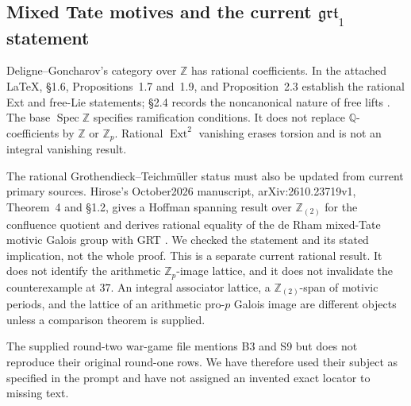 \documentclass[11pt,a4paper]{article}
\theoremstyle{definition}
\begin{document}
\subsection{Mixed Tate motives and the current \texorpdfstring{$\mathfrak{grt}_1$}{grt1} statement}

Deligne--Goncharov's category over $\mathbb Z$ has rational coefficients. In the attached LaTeX, \S1.6, Propositions~1.7 and~1.9, and Proposition~2.3 establish the rational Ext and free-Lie statements; \S2.4 records the noncanonical nature of free lifts \cite{DeligneGoncharov2005}. The base $\operatorname{Spec}\mathbb Z$ specifies ramification conditions. It does not replace $\mathbb Q$-coefficients by $\mathbb Z$ or $\mathbb Z_p$. Rational $\operatorname{Ext}^2$ vanishing erases torsion and is not an integral vanishing result.

The rational Grothendieck--Teichm\"uller status must also be updated from current primary sources. Hirose's October2026 manuscript, arXiv:2610.23719v1, Theorem~4 and \S1.2, gives a Hoffman spanning result over $\mathbb Z_{(2)}$ for the confluence quotient and derives rational equality of the de Rham mixed-Tate motivic Galois group with GRT \cite{Hirose2026}. We checked the statement and its stated implication, not the whole proof. This is a separate current rational result. It does not identify the arithmetic $\mathbb Z_p$-image lattice, and it does not invalidate the counterexample at $37$. An integral associator lattice, a $\mathbb Z_{(2)}$-span of motivic periods, and the lattice of an arithmetic pro-$p$ Galois image are different objects unless a comparison theorem is supplied.

The supplied round-two war-game file mentions B3 and S9 but does not reproduce their original round-one rows. We have therefore used their subject as specified in the prompt and have not assigned an invented exact locator to missing text.
\end{document}

